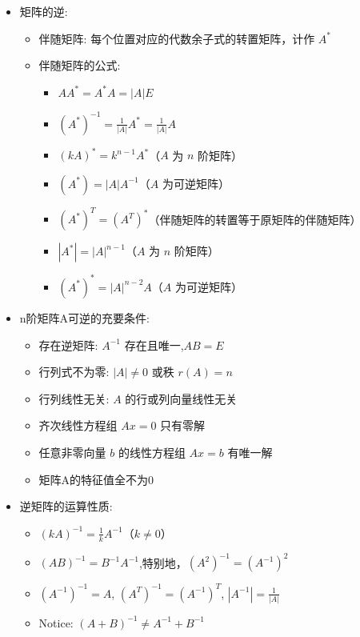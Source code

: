 \documentclass[10pt]{article}
\begin{document}
\begin{multicols}{2}
\begin{itemize}
\begin{itemize}
    \end{itemize}
  \item 矩阵的逆:
    \begin{itemize}
      \item 伴随矩阵: 每个位置对应的代数余子式的转置矩阵，计作 \(A^*\)
      \item 伴随矩阵的公式:
        \begin{itemize}
          \item \( A A^* = A^* A = |A| E \)
          \item \( (A^*)^{-1} = \frac{1}{|A|} A^* = \frac{1}{|A|} A \)
          \item \( ( k A )^* = k^{n-1} A^* \)（\(A\) 为 \(n\) 阶矩阵）
          \item \( (A^*) = |A| A^{-1} \)（\(A\) 为可逆矩阵）
          \item \( (A^*)^T = (A^T)^* \)（伴随矩阵的转置等于原矩阵的伴随矩阵）
          \item \( |A^*| = |A|^{n-1} \)（\(A\) 为 \(n\) 阶矩阵）
          \item \( (A^*)^* = |A|^{n-2} A \)（\(A\) 为可逆矩阵）
        \end{itemize}
    \end{itemize}
  \item n阶矩阵A可逆的充要条件:
    \begin{itemize}
      \item 存在逆矩阵: \(A^{-1}\) 存在且唯一,\(AB = E\)
      \item 行列式不为零: \(|A| \neq 0\) 或秩 \(r(A) = n\) 
      \item 行列线性无关: \(A\) 的行或列向量线性无关
      \item 齐次线性方程组 \(Ax = 0\) 只有零解
      \item 任意非零向量 \(b\) 的线性方程组 \(Ax = b\) 有唯一解
      \item 矩阵A的特征值全不为0
    \end{itemize}
  \item 逆矩阵的运算性质:
    \begin{itemize}
      \item \((kA)^{-1} = \frac{1}{k} A^{-1}\)（\(k \neq 0\)）
      \item \((AB)^{-1} = B^{-1} A^{-1}\),特别地，\((A^2)^{-1} = (A^{-1})^2\)
      \item \((A^{-1})^{-1} = A\), \((A^T)^{-1} = (A^{-1})^T\), \(|A^{-1}| = \frac{1}{|A|}\)
      \item Notice: \((A + B)^{-1} \neq A^{-1} + B^{-1}\)
    \end{itemize}
\end{itemize}


\end{multicols}
\end{document}
